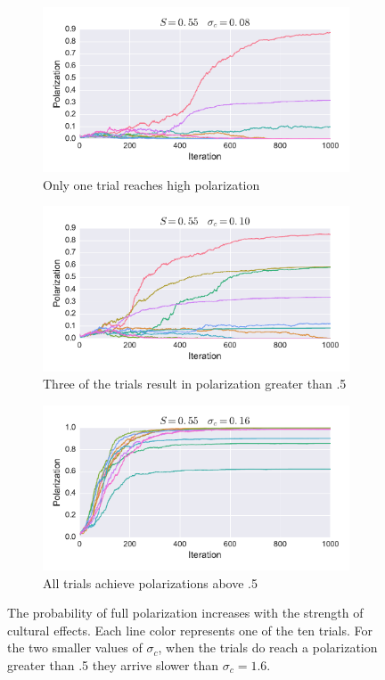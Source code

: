 \documentclass[11pt,letterpaper]{article}
\newcommand{\sigc}{\ensuremath{\sigma_c}}
\begin{document}
\begin{figure}
  \centering
  \begin{subfigure}[b]{\textwidth}
    \centering
    \includegraphics[width=.7\textwidth]{figures/s-0d55_sc-0d08_series.pdf}
    \caption{Only one trial reaches high polarization}
  \end{subfigure}

  \begin{subfigure}[b]{\textwidth}
    \centering
    \includegraphics[width=.7\textwidth]{figures/s-0d55_sc-0d10_series.pdf}
    \caption{Three of the trials result in polarization greater than .5}
  \end{subfigure}

  \begin{subfigure}[b]{\textwidth}
    \centering
    \includegraphics[width=.7\textwidth]{figures/s-0d55_sc-0d16_series.pdf}
    \caption{All trials achieve polarizations above .5}
  \end{subfigure}
  \caption{The probability of full polarization increases with the strength of
    cultural effects. Each line color represents one of the ten trials. For
    the two smaller values of $\sigc$, when the trials do reach a polarization
    greater than .5 they arrive slower than $\sigc=1.6$.}
    \label{fig:series}
\end{figure}
\end{document}
